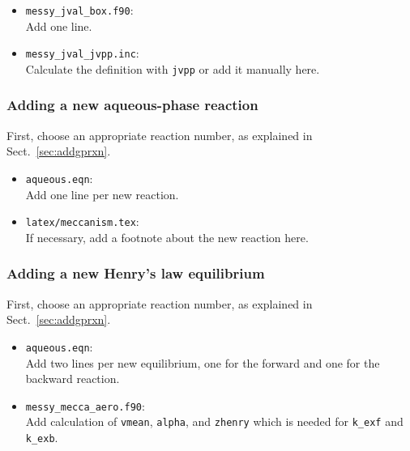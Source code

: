 \documentclass[twoside]{article}
\def\nosep{\setlength\parsep{0mm}\setlength\topsep{0mm}\setlength\itemsep{0mm}}
\begin{document}
\begin{itemize}\nosep
\item \verb|messy_jval_box.f90|:\\
  Add one line.
\item \verb|messy_jval_jvpp.inc|:\\
  Calculate the definition with \verb|jvpp| or add it manually here.
\end{itemize}

\subsubsection{Adding a new aqueous-phase reaction}

First, choose an appropriate reaction number, as explained in
Sect.~\ref{sec:addgprxn}.

\begin{itemize}\nosep
\item \verb|aqueous.eqn|:\\
  Add one line per new reaction.
\end{itemize}

\begin{itemize}\nosep
\item \verb|latex/meccanism.tex|:\\
  If necessary, add a footnote about the new reaction here.
\end{itemize}

\subsubsection{Adding a new Henry's law equilibrium}

First, choose an appropriate reaction number, as explained in
Sect.~\ref{sec:addgprxn}.

\begin{itemize}\nosep
\item \verb|aqueous.eqn|:\\
  Add two lines per new equilibrium, one for the forward and one for the
  backward reaction.
\end{itemize}

\begin{itemize}\nosep
\item \verb|messy_mecca_aero.f90|:\\
  Add calculation of \verb|vmean|, \verb|alpha|, and \verb|zhenry| which
  is needed for \verb|k_exf| and \verb|k_exb|.
\end{itemize}
\end{document}
